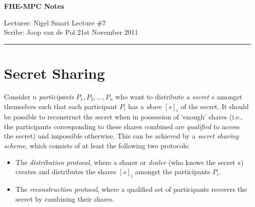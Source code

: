 \documentclass[11pt]{article}
\begin{document}
\thispagestyle{empty}


\begin{center}
\bf\large FHE-MPC Notes
\end{center}

\noindent
Lecturer: Nigel Smart               %
\hfill
Lecture \#7               %
\\
Scribe: Joop van de Pol                 %
\hfill
21st November 2011                         %

\noindent
\rule{\textwidth}{1pt}

\medskip

\section*{Secret Sharing}
\nocite{Scho09}
Consider $n$ {\it participants} $P_1, P_2, \ldots, P_n$ who want to distribute a {\it secret} $s$ amongst themselves such that each participant $P_i$ has a {\it share} $[s]_i$ of the secret. It should be possible to reconstruct the secret when in possession of `enough' shares (i.e., the participants corresponding to these shares combined are {\it qualified} to access the secret) and impossible otherwise. This can be achieved by a {\it secret sharing scheme}, which consists of at least the following two protocols:
\begin{itemize}
 \item{The {\it distribution protocol}, where a sharer or {\it dealer} (who knows the secret $s$) creates and distributes the shares $[s]_i$ amongst the participants $P_i$.} 
 \item{The {\it reconstruction protocol}, where a qualified set of participants recovers the secret by combining their shares.}
\end{itemize}
\end{document}
